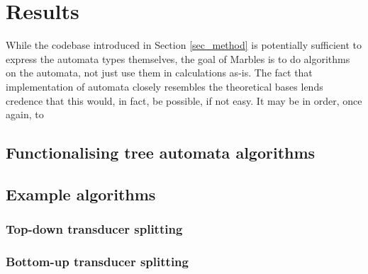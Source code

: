 \section{Results}

While the codebase introduced in Section \ref{sec_method} is potentially
sufficient to express the automata types themselves, the goal of Marbles is
to do algorithms on the automata, not just use them in calculations as-is.
The fact that implementation of automata closely resembles the theoretical
bases lends credence that this would, in fact, be possible, if not easy. It
may be in order, once again, to 

\subsection{Functionalising tree automata algorithms}

\subsection{Example algorithms}

\subsubsection{Top-down transducer splitting}

\subsubsection{Bottom-up transducer splitting}


